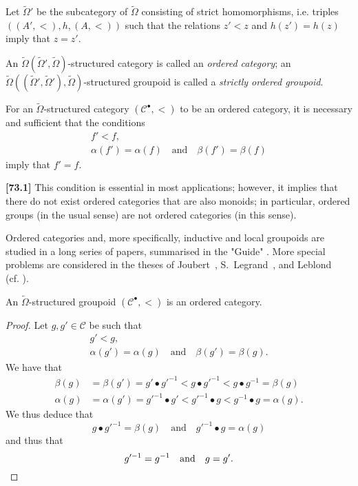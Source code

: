 \documentclass[a4paper,fleqn]{article}
\theoremstyle{plain}
\newenvironment{proposition}[1]
  {\renewcommand\theinnerproposition{#1}\innerproposition}
  {\endinnerproposition}
\theoremstyle{definition}
\newenvironment{definition}[1]
  {\renewcommand\theinnerdefinition{#1}\innerdefinition}
  {\endinnerdefinition}
\newenvironment{longcomm}[1]
  {\noindent\textbf{[#1]}\rmfamily}
  {}
\newcommand{\oldpage}[1]{{\marginpar{\footnotesize$\bigg\vert$\,\,\,\,\textit{p.~#1}}}}
\newcommand{\textand}{\quad\text{and}\quad}
\newcommand{\CC}{\mathcal{C}}
\newcommand{\smallbullet}{\bullet}
\begin{document}
Let $\widetilde{\Omega}'$ be the subcategory of $\widetilde{\Omega}$ consisting of strict homomorphisms, i.e. triples $((A',<),h,(A,<))$ such that the relations $z'<z$ and $h(z')=h(z)$ imply that $z=z'$.

\begin{definition}{18}
\label{definition:ii-18}
  An $\widetilde{\Omega}(\widetilde{\Omega}',\widetilde{\Omega})$-structured category is called an \emph{ordered category};
  an $\widetilde{\Omega}((\widetilde{\Omega}',\widetilde{\Omega}'),\widetilde{\Omega})$-structured groupoid is called a \emph{strictly ordered groupoid}.
\end{definition}

For an $\widetilde{\Omega}$-structured category $(\CC^\smallbullet,<)$ to be an ordered category, it is necessary and sufficient that the conditions
\[
  \begin{gathered}
    f'<f,
  \\\alpha(f')=\alpha(f)
    \textand
    \beta(f')=\beta(f)
  \end{gathered}
\]
imply that $f'=f$.

\begin{longcomm}{73.1}
  This condition is essential in most applications;
  however, it implies that there do not exist ordered categories that are also monoids;
  in particular, ordered groups (in the usual sense) are not ordered categories (in this sense).

  Ordered categories and, more specifically, inductive and local groupoids are studied in a long series of papers, summarised in the "Guide" \cite{coll86}.
  More special problems are considered in the theses of Joubert~\cite{comm57}, S.~Legrand~\cite{comm68}, and Leblond~\cite{comm66} (cf. \cite[Part~II]{coll}).
\end{longcomm}

\begin{proposition}{18}
\label{proposition:ii-18}
  \oldpage{402}
  An $\widetilde{\Omega}$-structured groupoid $(\CC^\smallbullet,<)$ is an ordered category.
\end{proposition}

\begin{proof}
  Let $g,g'\in\CC$ be such that
  \[
    \begin{gathered}
      g'<g,
    \\\alpha(g')=\alpha(g)
      \textand
      \beta(g')=\beta(g).
    \end{gathered}
  \]
  We have that
  \[
    \begin{aligned}
      \beta(g)
      &= \beta(g')
      = g'\smallbullet g'^{-1}
      < g\smallbullet g'^{-1}
      < g\smallbullet g^{-1}
      = \beta(g)
    \\\alpha(g)
      &= \alpha(g')
      = g'^{-1}\smallbullet g'
      < g'^{-1}\smallbullet g
      < g^{-1}\smallbullet g
      = \alpha(g).
    \end{aligned}
  \]
  We thus deduce that
  \[
    g\smallbullet g'^{-1} = \beta(g)
    \textand
    g'^{-1}\smallbullet g = \alpha(g)
  \]
  and thus that
  \[
    g'^{-1}=g^{-1}
    \textand
    g=g'.
    \qedhere
  \]
\end{proof}
\end{document}
